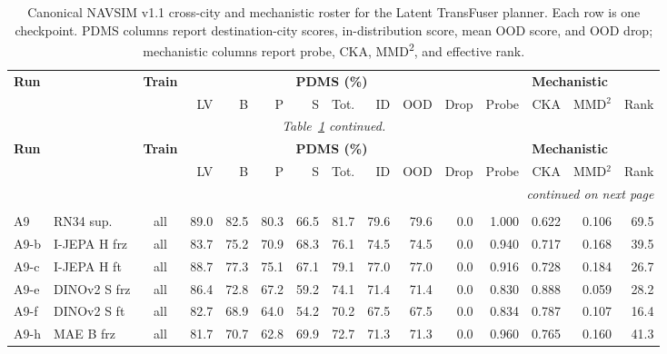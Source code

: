 \begin{longtable}{@{}l>{\raggedright\arraybackslash}p{2.2cm}crrrrrrrrrrrr@{}}
\caption[Canonical NAVSIM v1.1 consolidated cross-city and mechanistic roster, Latent TransFuser block.]{Canonical NAVSIM v1.1 cross-city and mechanistic roster for the Latent TransFuser planner. Each row is one checkpoint. PDMS columns report destination-city scores, in-distribution score, mean OOD score, and OOD drop; mechanistic columns report probe, CKA, MMD\textsuperscript{2}, and effective rank.}\label{tab:navsim_pdms_merged_v11_latf} \\
\toprule
\multirow{2}{*}{\textbf{Run}} & \multirow{2}{*}{\textbf{Backbone}} & \multirow{2}{*}{\textbf{Train}} & \multicolumn{8}{c}{\textbf{PDMS (\%)}} & \multicolumn{4}{c}{\textbf{Mechanistic}} \\
\cmidrule(lr){4-11}\cmidrule(lr){12-15}
& & & LV & B & P & S & Tot. & ID & OOD & Drop & Probe & CKA & MMD$^2$ & Rank \\
\midrule
\endfirsthead
\multicolumn{15}{c}{\textit{Table~\ref{tab:navsim_pdms_merged_v11_latf} continued.}} \\
\toprule
\multirow{2}{*}{\textbf{Run}} & \multirow{2}{*}{\textbf{Backbone}} & \multirow{2}{*}{\textbf{Train}} & \multicolumn{8}{c}{\textbf{PDMS (\%)}} & \multicolumn{4}{c}{\textbf{Mechanistic}} \\
\cmidrule(lr){4-11}\cmidrule(lr){12-15}
& & & LV & B & P & S & Tot. & ID & OOD & Drop & Probe & CKA & MMD$^2$ & Rank \\
\midrule
\endhead
\midrule
\multicolumn{15}{r}{\textit{continued on next page}} \\
\endfoot
\bottomrule
\endlastfoot
\multicolumn{15}{@{}l}{\textbf{All-city training}} \\
A9 & RN34 sup. & all & 89.0 & 82.5 & 80.3 & 66.5 & 81.7 & 79.6 & 79.6 & 0.0 & 1.000 & 0.622 & 0.106 & 69.5 \\
A9-b & I-JEPA H frz & all & 83.7 & 75.2 & 70.9 & 68.3 & 76.1 & 74.5 & 74.5 & 0.0 & 0.940 & 0.717 & 0.168 & 39.5 \\
A9-c & I-JEPA H ft & all & 88.7 & 77.3 & 75.1 & 67.1 & 79.1 & 77.0 & 77.0 & 0.0 & 0.916 & 0.728 & 0.184 & 26.7 \\
A9-e & DINOv2 S frz & all & 86.4 & 72.8 & 67.2 & 59.2 & 74.1 & 71.4 & 71.4 & 0.0 & 0.830 & 0.888 & 0.059 & 28.2 \\
A9-f & DINOv2 S ft & all & 82.7 & 68.9 & 64.0 & 54.2 & 70.2 & 67.5 & 67.5 & 0.0 & 0.834 & 0.787 & 0.107 & 16.4 \\
A9-h & MAE B frz & all & 81.7 & 70.7 & 62.8 & 69.9 & 72.7 & 71.3 & 71.3 & 0.0 & 0.960 & 0.765 & 0.160 & 41.3 \\

\end{longtable}
